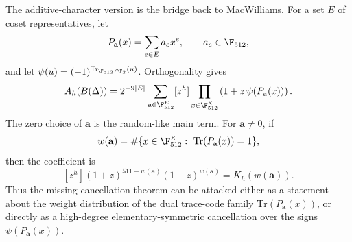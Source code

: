 The additive-character version is the bridge back to MacWilliams.  For a set \(E\) of coset representatives, let
\[
P_{\mathbf a}(x)=\sum_{e\in E}a_e x^e,\qquad a_e\in\F_{512},
\]
and let \(\psi(u)=(-1)^{\mathrm{Tr}_{\F_{512}/\F_2}(u)}\).  Orthogonality gives
\[
A_h(B(\Delta))
=2^{-9|E|}
\sum_{\mathbf a\in\F_{512}^{E}}
[z^h]\prod_{x\in\F_{512}^\times}\left(1+z\,\psi(P_{\mathbf a}(x))\right).
\]
The zero choice of \(\mathbf a\) is the random-like main term.  For \(\mathbf a\ne0\), if
\[
w(\mathbf a)=\#\{x\in\F_{512}^\times:\ \mathrm{Tr}(P_{\mathbf a}(x))=1\},
\]
then the coefficient is
\[
[z^h](1+z)^{511-w(\mathbf a)}(1-z)^{w(\mathbf a)}=K_h(w(\mathbf a)).
\]
Thus the missing cancellation theorem can be attacked either as a statement about the weight distribution of the dual
trace-code family \(\mathrm{Tr}(P_{\mathbf a}(x))\), or directly as a high-degree elementary-symmetric cancellation
over the signs \(\psi(P_{\mathbf a}(x))\).

